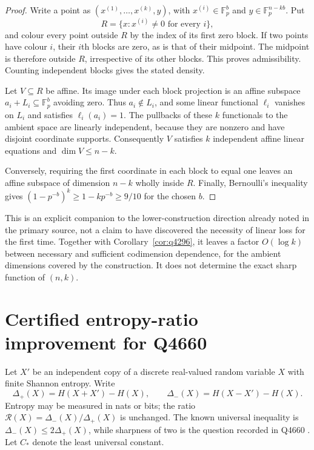 \documentclass[11pt]{article}
\theoremstyle{remark}
\newcommand{\Fp}{\mathbb F_p}
\begin{document}
\begin{proof}
Write a point as $(x^{(1)},\ldots,x^{(k)},y)$, with
$x^{(i)}\in\Fp^b$ and $y\in\Fp^{n-kb}$. Put
\[
 R=\{x:x^{(i)}\ne0\text{ for every }i\},
\]
and colour every point outside $R$ by the index of its first zero block.
If two points have colour $i$, their $i$th blocks are zero, as is that of
their midpoint. The midpoint is therefore outside $R$, irrespective of
its other blocks. This proves admissibility. Counting independent blocks
gives the stated density.

Let $V\subseteq R$ be affine. Its image under each block projection is an
affine subspace $a_i+L_i\subseteq\Fp^b$ avoiding zero. Thus $a_i\notin L_i$,
and some linear functional $\ell_i$ vanishes on $L_i$ and satisfies
$\ell_i(a_i)=1$. The pullbacks of these $k$ functionals to the ambient
space are linearly independent, because they are nonzero and have disjoint
coordinate supports. Consequently $V$ satisfies $k$ independent affine
linear equations and $\dim V\leq n-k$.

Conversely, requiring the first coordinate in each block to equal one
leaves an affine subspace of dimension $n-k$ wholly inside $R$.
Finally, Bernoulli's inequality gives
$(1-p^{-b})^k\geq1-kp^{-b}\geq9/10$ for the chosen $b$.
\end{proof}

This is an explicit companion to the lower-construction direction already
noted in the primary source, not a claim to have discovered the necessity
of linear loss for the first time. Together with
Corollary~\ref{cor:q4296}, it leaves a factor $O(\log k)$ between necessary
and sufficient codimension dependence, for the ambient dimensions covered
by the construction. It does not determine the exact sharp function of
$(n,k)$.

\section{Certified entropy-ratio improvement for Q4660}

Let $X'$ be an independent copy of a discrete real-valued random variable
$X$ with finite Shannon entropy. Write
\[
 \Delta_+(X)=H(X+X')-H(X),\qquad
 \Delta_-(X)=H(X-X')-H(X).
\]
Entropy may be measured in nats or bits; the ratio
$\mathcal R(X)=\Delta_-(X)/\Delta_+(X)$ is unchanged. The known universal
inequality is $\Delta_-(X)\leq2\Delta_+(X)$, while sharpness of two is the
question recorded in Q4660 \cite{entropy}. Let $C_*$ denote the least
universal constant.
\end{document}
